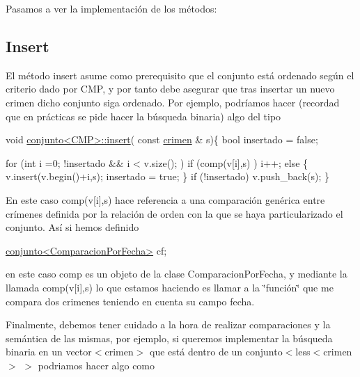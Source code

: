 Pasamos a ver la implementación de los métodos\-:\hypertarget{index_insert}{}\subsection{Insert}\label{index_insert}
El método insert asume como prerequisito que el conjunto está ordenado según el criterio dado por C\-M\-P, y por tanto debe asegurar que tras insertar un nuevo crimen dicho conjunto siga ordenado. Por ejemplo, podríamos hacer (recordad que en prácticas se pide hacer la búsqueda binaria) algo del tipo 
\begin{DoxyCode}
\textcolor{keywordtype}{void} \hyperlink{classconjunto_a61c22092268cc91439b93a2fd96e4173}{conjunto<CMP>::insert}( \textcolor{keyword}{const} \hyperlink{classcrimen}{crimen} & s)\{
        \textcolor{keywordtype}{bool} insertado = \textcolor{keyword}{false};

        \textcolor{keywordflow}{for} (\textcolor{keywordtype}{int} i =0; !insertado && i < v.size(); )
            \textcolor{keywordflow}{if} (comp(v[i],s) ) i++;
            \textcolor{keywordflow}{else} \{
              v.insert(v.begin()+i,s);
              insertado = \textcolor{keyword}{true};
            \}
        \textcolor{keywordflow}{if} (!insertado) v.push\_back(s);
     \}
\end{DoxyCode}


En este caso comp(v\mbox{[}i\mbox{]},s) hace referencia a una comparación genérica entre crímenes definida por la relación de orden con la que se haya particularizado el conjunto. Así si hemos definido


\begin{DoxyCode}
\hyperlink{classconjunto}{conjunto<ComparacionPorFecha>} cf;
\end{DoxyCode}


en este caso comp es un objeto de la clase Comparacion\-Por\-Fecha, y mediante la llamada comp(v\mbox{[}i\mbox{]},s) lo que estamos haciendo es llamar a la \char`\"{}función\char`\"{} que me compara dos crimenes teniendo en cuenta su campo fecha.

Finalmente, debemos tener cuidado a la hora de realizar comparaciones y la semántica de las mismas, por ejemplo, si queremos implementar la búsqueda binaria en un vector$<$crimen$>$ que está dentro de un conjunto$<$less$<$crimen$>$ $>$ podriamos hacer algo como


